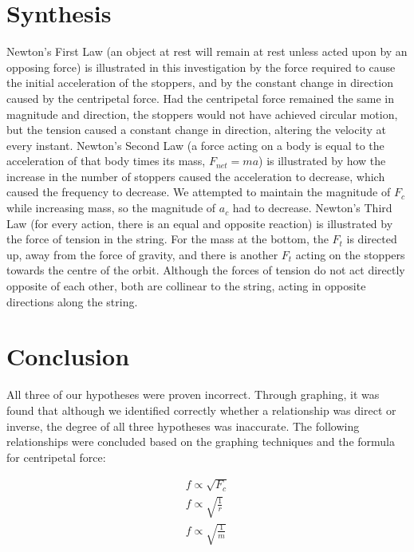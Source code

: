 \documentclass{article}[12pt]
\begin{document}
\section*{Synthesis}
Newton’s First Law (an object at rest will remain at rest unless acted upon by an opposing force) is illustrated in this investigation by the force required to cause the initial acceleration of the stoppers, and by the constant change in direction caused by the centripetal force. Had the centripetal force remained the same in magnitude and direction, the stoppers would not have achieved circular motion, but the tension caused a constant change in direction, altering the velocity at every instant.
Newton’s Second Law (a force acting on a body is equal to the acceleration of that body times its mass, $F_{net} = ma$) is illustrated by how the increase in the number of stoppers caused the acceleration to decrease, which caused the frequency to decrease. We attempted to maintain the magnitude of $F_c$ while increasing mass, so the magnitude of $a_c$ had to decrease.
Newton’s Third Law (for every action, there is an equal and opposite reaction) is illustrated by the force of tension in the string. For the mass at the bottom, the $F_t$ is directed up, away from the force of gravity, and there is another $F_t$ acting on the stoppers towards the centre of the orbit. Although the forces of tension do not act directly opposite of each other, both are collinear to the string, acting in opposite directions along the string. 

\section*{Conclusion}
All three of our hypotheses were proven incorrect. Through graphing, it was found that although we identified correctly whether a relationship was direct or inverse, the degree of all three hypotheses was inaccurate. The following relationships were concluded based on the graphing techniques and the formula for centripetal force:

\begin{eqnarray}
f\propto \sqrt{F_c}\\
f\propto \sqrt{\frac{1}{r}}\\
f\propto \sqrt{\frac{1}{m}}
\end{eqnarray}
\end{document}
